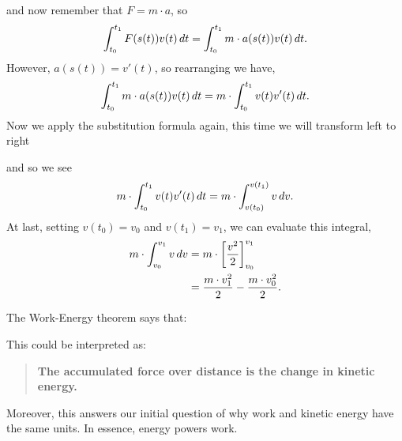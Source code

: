 \documentclass{ximera}
\begin{document}
\begin{theorem}
\begin{explanation}
    and now remember that $F=m\cdot a$, so
    \[
    \int_{t_0}^{t_1} F(s(t)) v(t) \,d t = \int_{t_0}^{t_1} m\cdot a(s(t)) v(t) \,d t.
    \]
    However, $a(s(t)) = v'(t)$, so rearranging we have,
    \[
    \int_{t_0}^{t_1} m\cdot a(s(t)) v(t) \,d t = m\cdot \int_{t_0}^{t_1} v(t) v'(t)\,d t.
    \]
    Now we apply the substitution formula again, this time we will transform left to right
    \begin{image}
    \end{image}
    and so we see
    \[
    m\cdot \int_{t_0}^{t_1} v(t) v'(t)\,d t = m\cdot \int_{v(t_0)}^{v(t_1)} v \,d v.
    \]
    At last, setting $v(t_0) = v_0$ and $v(t_1) = v_1$, we can evaluate
    this integral,
    \begin{align*}
      m \cdot \int_{v_0}^{v_1} v \,d v &= m \cdot \bigg[ \frac{v^2}{2} \bigg]_{v_0}^{v_1}\\
      &=\frac{m\cdot v_1^2}{2} - \frac{m\cdot v_0^2}{2}.
    \end{align*}
  \end{explanation}
\end{theorem}

The Work-Energy theorem says that:
\begin{center}
\end{center}
This could be interpreted as:
\begin{quote}\large\textbf{The \textcolor{green!70!black!70!blue}{accumulated} \textcolor{purple!50!blue!90!black}{force} \textcolor{green!70!black!70!blue}{over distance} is the \textcolor{blue!70!green}{change in kinetic energy}.}
\end{quote}
Moreover, this answers our initial question of why work and kinetic
energy have the same units. In essence, energy powers work.
\end{document}
